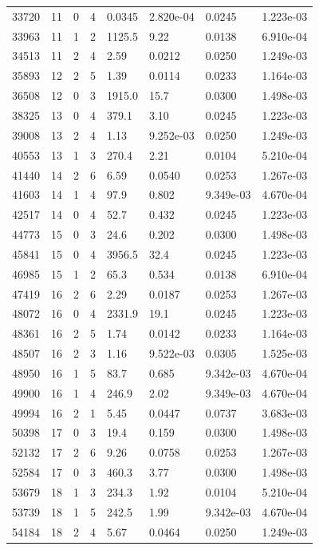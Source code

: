 \documentclass[preview]{standalone}
\begin{document}
{{{\begin{tabular}{L{1.2cm}C{1.2cm} C{0.3cm}C{0.5cm} C{1.4cm}C{1.4cm} C{1.4cm}C{1.4cm}}
  33720  &    11  & 0     &  4 &  0.0345  & 2.820e-04  & 0.0245 &  1.223e-03   \\ 
  33963  &    11  & 1     &  2 &  1125.5  & 9.22  & 0.0138 &  6.910e-04   \\ 
  34513  &    11  & 2     &  4 &  2.59  & 0.0212  & 0.0250 &  1.249e-03   \\ 
  35893  &    12  & 2     &  5 &  1.39  & 0.0114  & 0.0233 &  1.164e-03   \\ 
  36508  &    12  & 0     &  3 &  1915.0  & 15.7  & 0.0300 &  1.498e-03   \\ 
  38325  &    13  & 0     &  4 &  379.1  & 3.10  & 0.0245 &  1.223e-03   \\ 
  39008  &    13  & 2     &  4 &  1.13  & 9.252e-03  & 0.0250 &  1.249e-03   \\ 
  40553  &    13  & 1     &  3 &  270.4  & 2.21  & 0.0104 &  5.210e-04   \\ 
  41440  &    14  & 2     &  6 &  6.59  & 0.0540  & 0.0253 &  1.267e-03   \\ 
  41603  &    14  & 1     &  4 &  97.9  & 0.802  & 9.349e-03 &  4.670e-04   \\ 
  42517  &    14  & 0     &  4 &  52.7  & 0.432  & 0.0245 &  1.223e-03   \\ 
  44773  &    15  & 0     &  3 &  24.6  & 0.202  & 0.0300 &  1.498e-03   \\ 
  45841  &    15  & 0     &  4 &  3956.5  & 32.4  & 0.0245 &  1.223e-03   \\ 
  46985  &    15  & 1     &  2 &  65.3  & 0.534  & 0.0138 &  6.910e-04   \\ 
  47419  &    16  & 2     &  6 &  2.29  & 0.0187  & 0.0253 &  1.267e-03   \\ 
  48072  &    16  & 0     &  4 &  2331.9  & 19.1  & 0.0245 &  1.223e-03   \\ 
  48361  &    16  & 2     &  5 &  1.74  & 0.0142  & 0.0233 &  1.164e-03   \\ 
  48507  &    16  & 2     &  3 &  1.16  & 9.522e-03  & 0.0305 &  1.525e-03   \\ 
  48950  &    16  & 1     &  5 &  83.7  & 0.685  & 9.342e-03 &  4.670e-04   \\ 
  49900  &    16  & 1     &  4 &  246.9  & 2.02  & 9.349e-03 &  4.670e-04   \\ 
  49994  &    16  & 2     &  1 &  5.45  & 0.0447  & 0.0737 &  3.683e-03   \\ 
  50398  &    17  & 0     &  3 &  19.4  & 0.159  & 0.0300 &  1.498e-03   \\ 
  52132  &    17  & 2     &  6 &  9.26  & 0.0758  & 0.0253 &  1.267e-03   \\ 
  52584  &    17  & 0     &  3 &  460.3  & 3.77  & 0.0300 &  1.498e-03   \\ 
  53679  &    18  & 1     &  3 &  234.3  & 1.92  & 0.0104 &  5.210e-04   \\ 
  53739  &    18  & 1     &  5 &  242.5  & 1.99  & 9.342e-03 &  4.670e-04   \\ 
  54184  &    18  & 2     &  4 &  5.67  & 0.0464  & 0.0250 &  1.249e-03   \\ 
\hline 
\end{tabular} 

}}}
\end{document}
